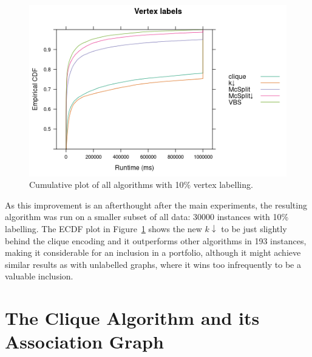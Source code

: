 \documentclass{l4proj}
\theoremstyle{definition}
\theoremstyle{remark}
\begin{document}
\begin{figure}
  \centering
  \includegraphics[scale=0.5]{images/ecdf_kdown.png}
  \caption{Cumulative plot of all algorithms with 10\% vertex labelling.}
  \label{fig:ecdf_kdown}
\end{figure}

As this improvement is an afterthought after the main experiments, the resulting
algorithm was run on a smaller subset of all data: \num{30000} instances with
10\% labelling. The ECDF plot in Figure~\ref{fig:ecdf_kdown} shows the new
$k{\downarrow}$ to be just slightly behind the clique encoding and it outperforms
other algorithms in 193 instances, making it considerable for an inclusion in
a portfolio, although it might achieve similar results as with unlabelled
graphs, where it wins too infrequently to be a valuable inclusion.

\section{The Clique Algorithm and its Association Graph}
\end{document}
